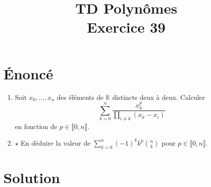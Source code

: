 \documentclass[french]{article}
\title{TD Polynômes \\ Exercice 39}
\date{}
\newcommand{\K}{\mathbb{K}}
\begin{document}
\maketitle

\section{Énoncé}
\begin{enumerate}
	\item Soit $x_0,\ldots,x_n$ des éléments de $\K$ distincts deux à deux. Calculer $$\sum_{k=0}^{n}\frac{x_k^p}{\prod_{i\ne k}(x_k-x_i)}$$ en fonction de $p\in\llbracket0,n\rrbracket$.
	\item $\star$ En déduire la valeur de $\displaystyle\sum_{k=0}^{n}(-1)^kk^p\binom{n}{k}$ pour $p\in\llbracket0,n\rrbracket$.
\end{enumerate}
\section{Solution}
\end{document}
